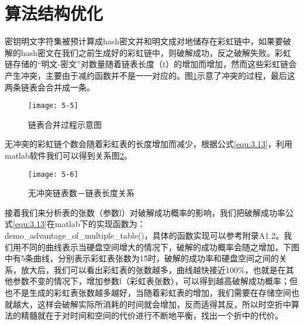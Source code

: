 \section{算法结构优化}
密钥明文字符集被预计算成hash密文并和明文成对地储存在彩虹链中，如果要破解的hash密文在我们之前生成好的彩虹链中，则破解成功，反之破解失败。彩虹链存储的“明文-密文”对数量随着链表长度（t）的增加而增加，然而这些彩虹链会产生冲突，主要由于减约函数并不是一一对应的。图\ref{fig:5.5}示意了冲突的过程，最后这两条链表会合并成一条。
\begin{figure}[!ht]
\centering
\texttt{[image: 5-5]}
\caption{链表合并过程示意图}
\label{fig:5.5}
\end{figure}

无冲突的彩虹链个数会随着彩虹表的长度增加而减少，根据公式\eqref{equ:3.13}，利用matlab软件我们可以得到关系图\ref{fig:5.6}。
\begin{figure}[!ht]
\centering
\texttt{[image: 5-6]}
\caption{无冲突链表数－链表长度关系}
\label{fig:5.6}
\end{figure}

接着我们来分析表的张数（参数l）对破解成功概率的影响，我们把破解成功率公式\eqref{equ:3.13}在matlab下的实现函数为：\\
demo\_advantage\_of\_multiple\_table()，具体的函数实现可以参考附录A1.2。我们用不同的曲线表示当硬盘空间增大的情况下，破解的成功概率会随之增加，下图中有5条曲线，分别表示彩虹表张数为1\~5时，破解的成功率和硬盘空间之间的关系，放大后，我们可以看出彩虹表的张数越多，曲线越快接近100\%，也就是在其他参数不变的情况下，增加参数l（彩虹表张数），可以得到越高破解成功概率；但也不是生成的彩虹表张数越多越好，当随着彩虹表的增加，我们需要在存储空间也就越大，这样会破解实际所消耗的时间就会增加，反而适得其反，所以时空折中算法的精髓就在于对时间和空间的代价进行不断地平衡，找出一个折中的代价。
\begin{figure}[!h]
\begin{floatrow}
\end{floatrow}
\end{figure}
\begin{figure}[!h]
\begin{floatrow}
\end{floatrow}
\end{figure}
\clearpage
